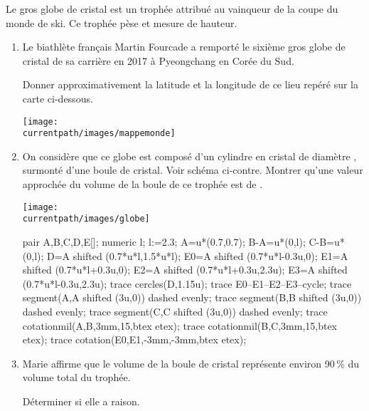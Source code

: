 \begin{exercice*}
    Le gros globe de cristal est un trophée attribué au vainqueur de la coupe du monde de ski.
    Ce trophée pèse  et mesure  de hauteur.

    \begin{enumerate}
        \item Le biathlète français Martin Fourcade a remporté le sixième gros globe de cristal de
        sa carrière en 2017 à Pyeongchang en Corée du Sud.

        Donner approximativement la latitude et la longitude de ce lieu repéré sur la carte ci-dessous.
        \begin{center}
            \texttt{[image: \\currentpath/images/mappemonde]}            
        \end{center}

        \item On considère que ce globe est composé d'un cylindre en cristal de diamètre , surmonté d'une boule de cristal.
        Voir schéma ci-contre. Montrer qu'une valeur approchée du volume de la boule de ce trophée est de .

        \begin{center}
            \begin{minipage}{0.4\linewidth}
                \vspace*{-10mm}
                \texttt{[image: \\currentpath/images/globe]}
            \end{minipage}            
            \begin{minipage}{0.4\linewidth}
                \begin{Geometrie}
                    pair A,B,C,D,E[];
                    numeric l;
                    l:=2.3;
                    A=u*(0.7,0.7);
                    B-A=u*(0,l);
                    C-B=u*(0,l);
                    D=A shifted (0.7*u*l,1.5*u*l);
                    E0=A shifted (0.7*u*l-0.3u,0);
                    E1=A shifted (0.7*u*l+0.3u,0);
                    E2=A shifted (0.7*u*l+0.3u,2.3u);
                    E3=A shifted (0.7*u*l-0.3u,2.3u);
                    trace cercles(D,1.15u);
                    trace E0--E1--E2--E3--cycle;
                    trace segment(A,A shifted (3u,0)) dashed evenly;
                    trace segment(B,B shifted (3u,0)) dashed evenly;
                    trace segment(C,C shifted (3u,0)) dashed evenly;
                    trace cotationmil(A,B,3mm,15,btex  etex);
                    trace cotationmil(B,C,3mm,15,btex  etex);
                    trace cotation(E0,E1,-3mm,-3mm,btex  etex);
                \end{Geometrie}
            \end{minipage}
        \end{center}
        
        \item Marie affirme que le volume de la boule de cristal représente environ 90\,\% du volume total du trophée.

        Déterminer si elle a raison.
    \end{enumerate}
\end{exercice*}
